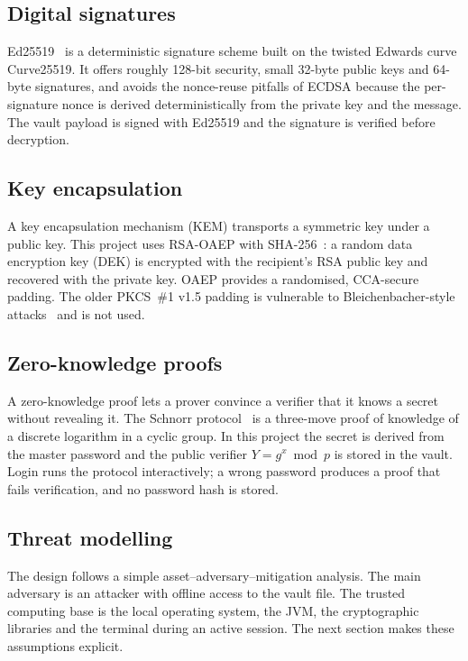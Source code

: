 \documentclass[11pt,a4paper]{article}
\begin{document}
\subsection{Digital signatures}

Ed25519~\cite{rfc8032,bernstein2012} is a deterministic signature scheme built on
the twisted Edwards curve Curve25519. It offers roughly 128-bit security, small
32-byte public keys and 64-byte signatures, and avoids the nonce-reuse pitfalls
of ECDSA because the per-signature nonce is derived deterministically from the
private key and the message. The vault payload is signed with Ed25519 and the
signature is verified before decryption.

\subsection{Key encapsulation}

A key encapsulation mechanism (KEM) transports a symmetric key under a public
key. This project uses RSA-OAEP with SHA-256~\cite{rfc8017}: a random data
encryption key (DEK) is encrypted with the recipient's RSA public key and
recovered with the private key. OAEP provides a randomised, CCA-secure padding.
The older PKCS~\#1 v1.5 padding is vulnerable to Bleichenbacher-style
attacks~\cite{bleichenbacher1998} and is not used.

\subsection{Zero-knowledge proofs}

A zero-knowledge proof lets a prover convince a verifier that it knows a secret
without revealing it. The Schnorr protocol~\cite{schnorr1991} is a three-move
proof of knowledge of a discrete logarithm in a cyclic group. In this project
the secret is derived from the master password and the public verifier
$Y = g^x \bmod p$ is stored in the vault. Login runs the protocol interactively;
a wrong password produces a proof that fails verification, and no password hash
is stored.

\subsection{Threat modelling}

The design follows a simple asset--adversary--mitigation analysis. The main
adversary is an attacker with offline access to the vault file. The trusted
computing base is the local operating system, the JVM, the cryptographic
libraries and the terminal during an active session. The next section makes
these assumptions explicit.
\end{document}
